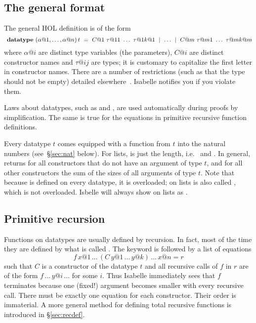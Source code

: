 \subsection{The general format}
\label{sec:general-datatype}

The general HOL  definition is of the form
\[
\isacommand{datatype}~(\alpha@1, \dots, \alpha@n) \, t ~=~
C@1~\tau@{11}~\dots~\tau@{1k@1} ~\mid~ \dots ~\mid~
C@m~\tau@{m1}~\dots~\tau@{mk@m}
\]
where $\alpha@i$ are distinct type variables (the parameters), $C@i$ are distinct
constructor names and $\tau@{ij}$ are types; it is customary to capitalize
the first letter in constructor names. There are a number of
restrictions (such as that the type should not be empty) detailed
elsewhere~\cite{isabelle-HOL}. Isabelle notifies you if you violate them.

Laws about datatypes, such as  and
, are used automatically
during proofs by simplification.  The same is true for the equations in
primitive recursive function definitions.

Every datatype $t$ comes equipped with a  function from $t$ into
the natural numbers (see~\S\ref{sec:nat} below). For lists,  is
just the length, i.e.\  and .  In general,  returns  for all constructors
that do not have an argument of type $t$, and for all other constructors
 the sum of the sizes of all arguments of type $t$. Note that because
 is defined on every datatype, it is overloaded; on lists
 is also called , which is not overloaded.
Isbelle will always show  on lists as .


\subsection{Primitive recursion}

Functions on datatypes are usually defined by recursion. In fact, most of the
time they are defined by what is called .
The keyword  is followed by a list of
equations
\[ f \, x@1 \, \dots \, (C \, y@1 \, \dots \, y@k)\, \dots \, x@n = r \]
such that $C$ is a constructor of the datatype $t$ and all recursive calls of
$f$ in $r$ are of the form $f \, \dots \, y@i \, \dots$ for some $i$. Thus
Isabelle immediately sees that $f$ terminates because one (fixed!) argument
becomes smaller with every recursive call. There must be exactly one equation
for each constructor.  Their order is immaterial.
A more general method for defining total recursive functions is introduced in
\S\ref{sec:recdef}.

